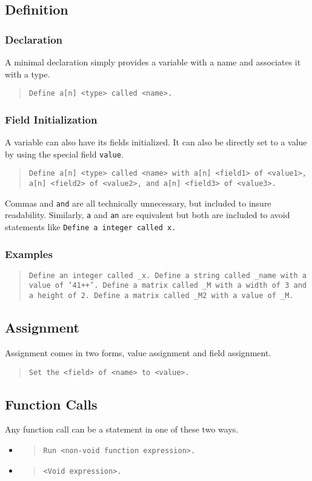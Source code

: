 \documentclass{article}
\newcommand{\code}[1]{\texttt{#1}}
\newcommand{\codeblock}[1]{\begin{quote}\code{#1}\end{quote}}
\begin{document}
\subsection{Definition}
\subsubsection{Declaration}
A minimal declaration simply provides a variable with a name and associates it with a type.

\codeblock{Define a[n] <type> called <name>.}

\subsubsection{Field Initialization}
A variable can also have its fields initialized. It can also be directly set to a value by using the special field \code{value}.

\codeblock{Define a[n] <type> called <name> with a[n] <field1> of <value1>, a[n] <field2> of <value2>, and a[n] <field3> of <value3>.}

\noindent Commas and \code{and} are all technically unnecessary, but included to insure readability. Similarly, \code{a} and \code{an} are equivalent but both are included to avoid statements like \code{Define a integer called x.}
\subsubsection{Examples}

\codeblock{Define an integer called \_{}x. Define a string called \_{}name with a value of '41++'. Define a matrix called \_{}M with a width of 3 and a height of 2. Define a matrix called \_{}M2 with a value of \_{}M.}

\subsection{Assignment}
Assignment comes in two forms, value assignment and field assignment.

\codeblock{Set the <field> of <name> to <value>.}

\subsection{Function Calls}
Any function call can be a statement in one of these two ways.

\begin{itemize}
\item \codeblock {Run <non-void function expression>.}
\item \codeblock {<Void expression>.}
\end{itemize}
\end{document}
